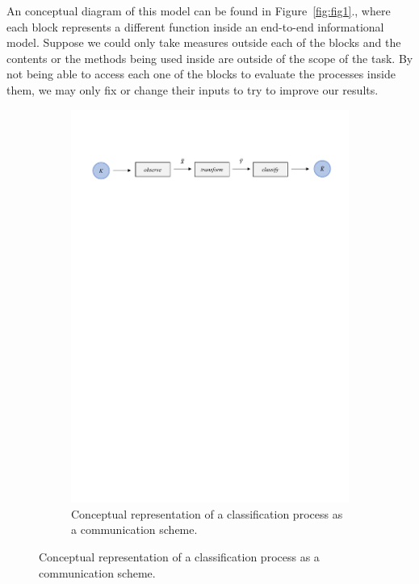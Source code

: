 An conceptual diagram of this model can be found in Figure~\ref{fig:fig1}., where each block represents a different function inside an end-to-end informational model. Suppose we could only take measures outside each of the blocks and the contents or the methods being used inside are outside of the scope of the task. By not being able to access each one of the blocks to evaluate the processes inside them, we may only fix or change their inputs to try to improve our results.
%
\begin{figure}[H]
\begin{subfigure}{1\textwidth}  
 \centering
  \includegraphics[width=16cm]{Figuras_tfg/Figura1_tfg}
  \caption{Conceptual representation of a classification process as a communication scheme.}
 \label{fig:fig1b} 
\end{subfigure}%


\end{figure}
